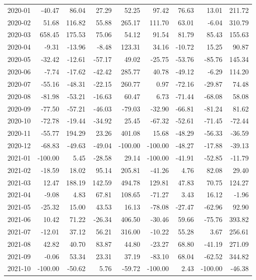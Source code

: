 \begin{table}[ht]
\begin{tabular}{lrrrrrrrr}
  2020-01 & -40.47 & 86.04 & 27.29 & 52.25 & 97.42 & 76.63 & 13.01 & 211.72 \\ 
  2020-02 & 51.68 & 116.82 & 55.88 & 265.17 & 111.70 & 63.01 & -6.04 & 310.79 \\ 
  2020-03 & 658.45 & 175.53 & 75.06 & 54.12 & 91.54 & 81.79 & 85.43 & 155.63 \\ 
  2020-04 & -9.31 & -13.96 & -8.48 & 123.31 & 34.16 & -10.72 & 15.25 & 90.87 \\ 
  2020-05 & -32.42 & -12.61 & -57.17 & 49.02 & -25.75 & -53.76 & -85.76 & 145.34 \\ 
  2020-06 & -7.74 & -17.62 & -42.42 & 285.77 & 40.78 & -49.12 & -6.29 & 114.20 \\ 
  2020-07 & -55.16 & -48.31 & -22.15 & 260.77 & 0.97 & -72.16 & -29.87 & 74.48 \\ 
  2020-08 & -81.98 & -53.21 & -16.63 & 60.47 & 6.73 & -71.44 & -68.08 & 58.08 \\ 
  2020-09 & -77.50 & -57.21 & -46.03 & -79.03 & -32.90 & -66.81 & -81.24 & 81.62 \\ 
  2020-10 & -72.78 & -19.44 & -34.92 & 25.45 & -67.32 & -52.61 & -71.45 & -72.44 \\ 
  2020-11 & -55.77 & 194.29 & 23.26 & 401.08 & 15.68 & -48.29 & -56.33 & -36.59 \\ 
  2020-12 & -68.83 & -49.63 & -49.04 & -100.00 & -100.00 & -48.27 & -17.88 & -39.13 \\ 
  2021-01 & -100.00 & 5.45 & -28.58 & 29.14 & -100.00 & -41.91 & -52.85 & -11.79 \\ 
  2021-02 & -18.59 & 18.02 & 95.14 & 205.81 & -41.26 & 4.76 & 82.08 & 29.40 \\ 
  2021-03 & 12.47 & 188.19 & 142.59 & 494.78 & 129.81 & 47.83 & 70.75 & 124.27 \\ 
  2021-04 & -9.08 & 4.83 & 67.81 & 108.65 & -71.27 & 3.43 & 16.12 & -1.96 \\ 
  2021-05 & -25.32 & 15.00 & 43.53 & 16.13 & -78.08 & -27.47 & -62.96 & 92.90 \\ 
  2021-06 & 10.42 & 71.22 & -26.34 & 406.50 & -30.46 & 59.66 & -75.76 & 393.82 \\ 
  2021-07 & -12.01 & 37.12 & 56.21 & 316.00 & -10.22 & 55.28 & 3.67 & 256.61 \\ 
  2021-08 & 42.82 & 40.70 & 83.87 & 44.80 & -23.27 & 68.80 & -41.19 & 271.09 \\ 
  2021-09 & -0.06 & 53.34 & 23.31 & 37.19 & -83.10 & 68.04 & -62.52 & 344.82 \\ 
  2021-10 & -100.00 & -50.62 & 5.76 & -59.72 & -100.00 & 2.43 & -100.00 & -46.38 \\ 

\end{tabular}
\end{table}
